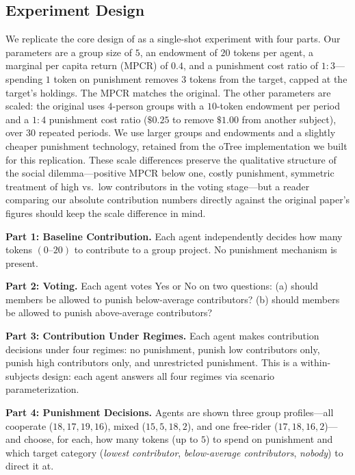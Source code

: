 \documentclass[12pt, a4paper]{article}
\begin{document}
\subsection{Experiment Design}

We replicate the core design of \citet{ertan2009who} as a single-shot experiment with four parts. Our parameters are a group size of $5$, an endowment of $20$ tokens per agent, a marginal per capita return (MPCR) of $0.4$, and a punishment cost ratio of $1{:}3$---spending $1$ token on punishment removes $3$ tokens from the target, capped at the target's holdings. The MPCR matches the original. The other parameters are scaled: the original \citet{ertan2009who} uses $4$-person groups with a $10$-token endowment per period and a $1{:}4$ punishment cost ratio ($\$0.25$ to remove $\$1.00$ from another subject), over $30$ repeated periods. We use larger groups and endowments and a slightly cheaper punishment technology, retained from the oTree implementation we built for this replication. These scale differences preserve the qualitative structure of the social dilemma---positive MPCR below one, costly punishment, symmetric treatment of high vs.\ low contributors in the voting stage---but a reader comparing our absolute contribution numbers directly against the original paper's figures should keep the scale difference in mind.

\textbf{Part 1: Baseline Contribution.} Each agent independently decides how many tokens $(0\text{--}20)$ to contribute to a group project. No punishment mechanism is present.

\textbf{Part 2: Voting.} Each agent votes Yes or No on two questions: (a) should members be allowed to punish below-average contributors? (b) should members be allowed to punish above-average contributors?

\textbf{Part 3: Contribution Under Regimes.} Each agent makes contribution decisions under four regimes: no punishment, punish low contributors only, punish high contributors only, and unrestricted punishment. This is a within-subjects design: each agent answers all four regimes via scenario parameterization.

\textbf{Part 4: Punishment Decisions.} Agents are shown three group profiles---all cooperate ($18, 17, 19, 16$), mixed ($15, 5, 18, 2$), and one free-rider ($17, 18, 16, 2$)---and choose, for each, how many tokens (up to $5$) to spend on punishment and which target category (\emph{lowest contributor}, \emph{below-average contributors}, \emph{nobody}) to direct it at.
\end{document}

